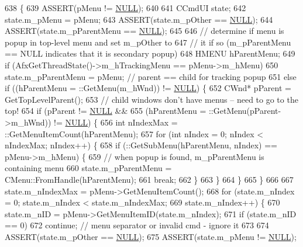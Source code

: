 \begin{DoxyCode}
638 \{
639   ASSERT(pMenu != \mbox{\hyperlink{getopt1_8c_a070d2ce7b6bb7e5c05602aa8c308d0c4}{NULL}});
640   
641   CCmdUI state;
642   state.m\_pMenu = pMenu;
643   ASSERT(state.m\_pOther == \mbox{\hyperlink{getopt1_8c_a070d2ce7b6bb7e5c05602aa8c308d0c4}{NULL}});
644   ASSERT(state.m\_pParentMenu == \mbox{\hyperlink{getopt1_8c_a070d2ce7b6bb7e5c05602aa8c308d0c4}{NULL}});
645   
646   \textcolor{comment}{// determine if menu is popup in top-level menu and set m\_pOther to}
647   \textcolor{comment}{//  it if so (m\_pParentMenu == NULL indicates that it is secondary popup)}
648   HMENU hParentMenu;
649   \textcolor{keywordflow}{if} (AfxGetThreadState()->m\_hTrackingMenu == pMenu->m\_hMenu)
650     state.m\_pParentMenu = pMenu;    \textcolor{comment}{// parent == child for tracking popup}
651   \textcolor{keywordflow}{else} \textcolor{keywordflow}{if} ((hParentMenu = ::GetMenu(m\_hWnd)) != \mbox{\hyperlink{getopt1_8c_a070d2ce7b6bb7e5c05602aa8c308d0c4}{NULL}}) \{
652     CWnd* pParent = GetTopLevelParent();
653     \textcolor{comment}{// child windows don't have menus -- need to go to the top!}
654     \textcolor{keywordflow}{if} (pParent != \mbox{\hyperlink{getopt1_8c_a070d2ce7b6bb7e5c05602aa8c308d0c4}{NULL}} &&
655         (hParentMenu = ::GetMenu(pParent->m\_hWnd)) != \mbox{\hyperlink{getopt1_8c_a070d2ce7b6bb7e5c05602aa8c308d0c4}{NULL}}) \{
656       \textcolor{keywordtype}{int} nIndexMax = ::GetMenuItemCount(hParentMenu);
657       \textcolor{keywordflow}{for} (\textcolor{keywordtype}{int} nIndex = 0; nIndex < nIndexMax; nIndex++) \{
658         \textcolor{keywordflow}{if} (::GetSubMenu(hParentMenu, nIndex) == pMenu->m\_hMenu) \{
659           \textcolor{comment}{// when popup is found, m\_pParentMenu is containing menu}
660           state.m\_pParentMenu = CMenu::FromHandle(hParentMenu);
661           \textcolor{keywordflow}{break};
662         \}
663       \}
664     \}
665   \}
666   
667   state.m\_nIndexMax = pMenu->GetMenuItemCount();
668   \textcolor{keywordflow}{for} (state.m\_nIndex = 0; state.m\_nIndex < state.m\_nIndexMax;
669        state.m\_nIndex++) \{
670     state.m\_nID = pMenu->GetMenuItemID(state.m\_nIndex);
671     \textcolor{keywordflow}{if} (state.m\_nID == 0)
672       \textcolor{keywordflow}{continue}; \textcolor{comment}{// menu separator or invalid cmd - ignore it}
673     
674     ASSERT(state.m\_pOther == \mbox{\hyperlink{getopt1_8c_a070d2ce7b6bb7e5c05602aa8c308d0c4}{NULL}});
675     ASSERT(state.m\_pMenu != \mbox{\hyperlink{getopt1_8c_a070d2ce7b6bb7e5c05602aa8c308d0c4}{NULL}});

\end{DoxyCode}
